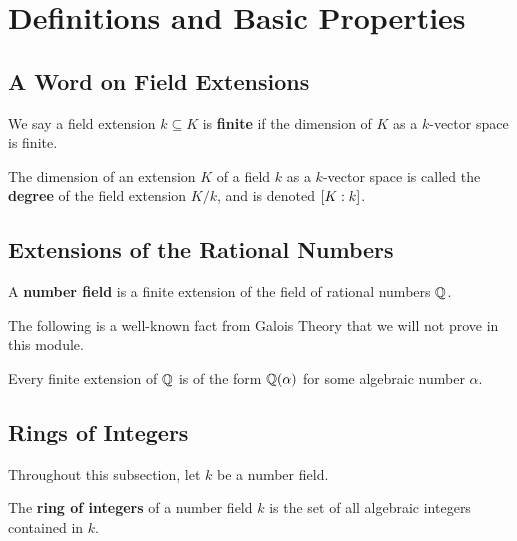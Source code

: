 \section{Definitions and Basic Properties}

\subsection{A Word on Field Extensions}

\begin{boxdefinition}
    We say a field extension $k \subseteq K$ is \textbf{finite} if the dimension of $K$ as a $k$-vector space is finite.
\end{boxdefinition}

\begin{boxdefinition}
    The dimension of an extension $K$ of a field $k$ as a $k$-vector space is called the \textbf{degree} of the field extension $K/k$, and is denoted $\left[ K : k \right]$.
\end{boxdefinition}

\subsection{Extensions of the Rational Numbers}

\begin{boxdefinition}
    A \textbf{number field} is a finite extension of the field of rational numbers $\mathbb{Q}$.
\end{boxdefinition}

The following is a well-known fact from Galois Theory that we will not prove in this module.

\begin{boxtheorem}\label{Ch2:Thm:Finite_Extensions_of_Q}
    Every finite extension of $\mathbb{Q}$ is of the form $\mathbb{Q}(\alpha)$ for some algebraic number $\alpha$.
\end{boxtheorem}

\subsection{Rings of Integers}

Throughout this subsection, let $k$ be a number field.

\begin{boxdefinition}
    The \textbf{ring of integers} of a number field $k$ is the set of all algebraic integers contained in $k$.
\end{boxdefinition}

